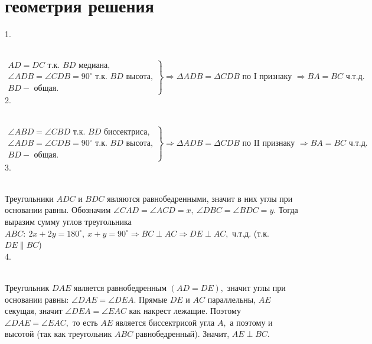 \section{геометрия решения}
1. \begin{figure}[ht!]
\end{figure}\\
$\left.\begin{array}{l}AD=DC\text{ т.к. }BD\text{ медиана,}\\
\angle ADB=\angle CDB=90^\circ \text{ т.к. }BD\text{ высота,}\\
BD - \text{ общая.}   \end{array}\right\}\Rightarrow
\Delta ADB=\Delta CDB\text{ по I признаку }\Rightarrow BA=BC\text{ ч.т.д.} $\\
2.  \begin{figure}[ht!]
\end{figure}\\
$\left.\begin{array}{l}\angle ABD=\angle CBD\text{ т.к. }BD\text{ биссектриса,}\\
\angle ADB=\angle CDB=90^\circ \text{ т.к. }BD\text{ высота,}\\
BD - \text{ общая.}   \end{array}\right\}\Rightarrow
\Delta ADB=\Delta CDB\text{ по II признаку }\Rightarrow BA=BC\text{ ч.т.д.} $\\
3. \begin{figure}[ht!]
\end{figure}\\
Треугольники $ADC$ и $BDC$ являются равнобедренными, значит в них углы при основании равны. Обозначим $\angle CAD=\angle ACD=x,\ \angle DBC=\angle BDC=y.$ Тогда выразим сумму углов треугольника $ABC:\ 2x+2y=180^\circ,\ x+y=90^\circ\Rightarrow BC \perp AC\Rightarrow DE\perp AC,$ ч.т.д. (т.к. $DE\parallel BC$)\\
4. \begin{figure}[ht!]
\end{figure}\\
Треугольник $DAE$ является равнобедренным $(AD=DE),$ значит углы при основании равны: $\angle DAE=\angle DEA.$ Прямые $DE$ и $AC$ параллельны, $AE$ секущая, значит  $\angle DEA=\angle EAC$ как накрест лежащие. Поэтому $\angle DAE=\angle EAC,$ то есть $AE$ является биссектрисой угла $A,$ а поэтому и высотой (так как треугольник $ABC$ равнобедренный). Значит, $AE\perp BC.$\\

